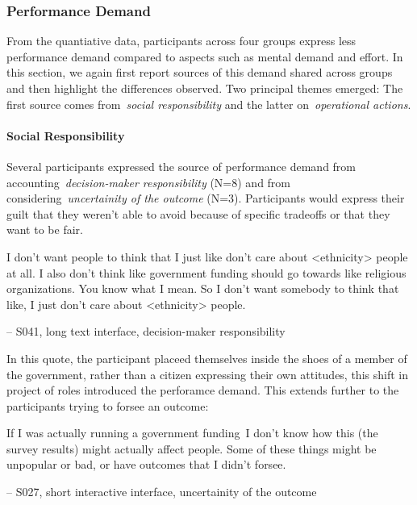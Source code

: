 \subsubsection{Performance Demand} 
From the quantiative data, participants across four groups express less performance demand compared to aspects such as mental demand and effort. In this section, we again first report sources of this demand shared across groups and then highlight the differences observed. Two principal themes emerged: The first source comes from~\textit{social responsibility} and the latter on~\textit{operational actions}.

\paragraph{Social Responsibility}
Several participants expressed the source of performance demand from accounting~\textit{decision-maker responsibility} (N=8) and from considering~\textit{uncertainity of the outcome} (N=3). Participants would express their guilt that they weren't able to avoid because of specific tradeoffs or that they want to be fair.

\begin{displayquote}
    I don't want people to think that I just like don't care about <ethnicity> people at all. I also don't think like government funding should go towards like religious organizations. You know what I mean. So I don't want somebody to think that like, I just don't care about <ethnicity> people.
    
\noindent \hfill -- S041, long text interface, decision-maker responsibility
\end{displayquote}

In this quote, the participant placeed themselves inside the shoes of a member of the government, rather than a citizen expressing their own attitudes, this shift in project of roles introduced the perforamce demand. This extends further to the participants trying to forsee an outcome:

\begin{displayquote}
If I was actually running a government funding~\bracketellipsis I don't know how this (the survey results) might actually affect people. Some of these things might be unpopular or bad, or have outcomes that I didn't forsee.
    
\noindent \hfill -- S027, short interactive interface, uncertainity of the outcome
\end{displayquote}

